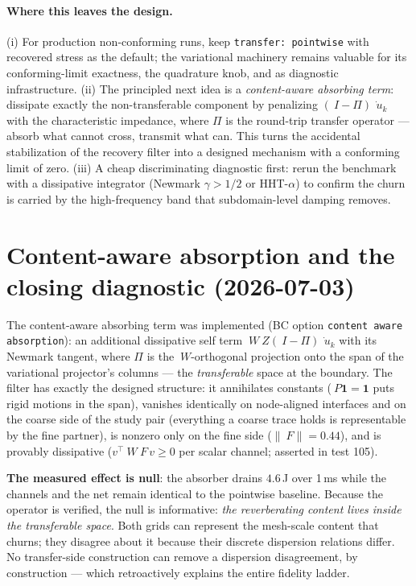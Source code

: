 \documentclass[11pt]{article}
\begin{document}
\paragraph{Where this leaves the design.}
(i) For production non-conforming runs, keep \texttt{transfer:
pointwise} with recovered stress as the default; the variational
machinery remains valuable for its conforming-limit exactness, the
quadrature knob, and as diagnostic infrastructure.
(ii) The principled next idea is a \emph{content-aware absorbing
term}: dissipate exactly the non-transferable component by penalizing
$(~I - \Pi)\,\dot{~u}_k$ with the characteristic impedance, where
$\Pi$ is the round-trip transfer operator --- absorb what cannot
cross, transmit what can.  This turns the accidental stabilization of
the recovery filter into a designed mechanism with a conforming limit
of zero.
(iii) A cheap discriminating diagnostic first: rerun the benchmark
with a dissipative integrator (Newmark $\gamma > 1/2$ or HHT-$\alpha$)
to confirm the churn is carried by the high-frequency band that
subdomain-level damping removes.

\section{Content-aware absorption and the closing diagnostic
(2026-07-03)}

The content-aware absorbing term was implemented (BC option
\texttt{content aware absorption}): an additional dissipative self
term $~W ~Z (~I - \Pi)\,\dot{~u}_k$ with its Newmark tangent, where
$\Pi$ is the $~W$-orthogonal projection onto the span of the
variational projector's columns --- the \emph{transferable} space at
the boundary.  The filter has exactly the designed structure: it
annihilates constants ($~P\mathbf{1} = \mathbf{1}$ puts rigid motions
in the span), vanishes identically on node-aligned interfaces and on
the coarse side of the study pair (everything a coarse trace holds is
representable by the fine partner), is nonzero only on the fine side
($\lVert ~F \rVert = 0.44$), and is provably dissipative
($v^\top ~W ~F\, v \ge 0$ per scalar channel; asserted in test 105).

\textbf{The measured effect is null}: the absorber drains $4.6$\,J
over 1\,ms while the channels and the net remain identical to the
pointwise baseline.  Because the operator is verified, the null is
informative: \emph{the reverberating content lives inside the
transferable space}.  Both grids can represent the mesh-scale content
that churns; they disagree about it because their discrete dispersion
relations differ.  No transfer-side construction can remove a
dispersion disagreement, by construction --- which retroactively
explains the entire fidelity ladder.
\end{document}
